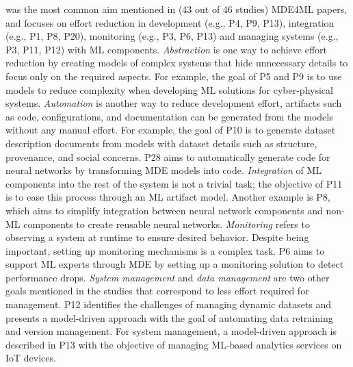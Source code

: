 was the most common aim mentioned in (43 out of 46 studies) MDE4ML papers, and focuses on effort reduction in development (e.g., P4, P9, P13), integration (e.g., P1, P8, P20), monitoring (e.g., P3, P6, P13) and managing systems (e.g., P3, P11, P12) with ML components. \textit{Abstraction} is one way to achieve effort reduction by creating models of complex systems that hide unnecessary details to focus only on the required aspects. For example, the goal of P5 and P9 is to use models to reduce complexity when developing ML solutions for cyber-physical systems. \textit{Automation} is another way to reduce development effort, artifacts such as code, configurations, and documentation can be generated from the models without any manual effort. For example, the goal of P10 is to generate dataset description documents from models with dataset details such as structure, provenance, and social concerns. P28 aims to automatically generate code for neural networks by transforming MDE models into code. \textit{Integration} of ML components into the rest of the system is not a trivial task; the objective of P11 is to ease this process through an ML artifact model. Another example is P8, which aims to simplify integration between neural network components and non-ML components to create reusable neural networks. \textit{Monitoring} refers to observing a system at runtime to ensure desired behavior. Despite being important, setting up monitoring mechanisms is a complex task. P6 aims to support ML experts through MDE by setting up a monitoring solution to detect performance drops. \textit{System management} and \textit{data management} are two other goals mentioned in the studies that correspond to less effort required for management. P12 identifies the challenges of managing dynamic datasets and presents a model-driven approach with the goal of automating data retraining and version management. For system management, a model-driven approach is described in P13 with the objective of managing ML-based analytics services on IoT devices.\\


